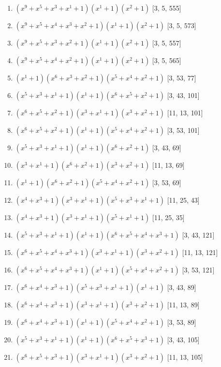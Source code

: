 \documentclass[10pt,twocolumn]{article}
\begin{document}
\begin{enumerate}
\item $(x^{9} + x^{5} + x^{3} + x^{1} + 1)(x^{1} + 1)(x^{2} + 1)$  [3, 5, 555]
\item $(x^{9} + x^{5} + x^{4} + x^{3} + x^{2} + 1)(x^{1} + 1)(x^{2} + 1)$  [3, 5, 573]
\item $(x^{9} + x^{5} + x^{3} + x^{2} + 1)(x^{1} + 1)(x^{2} + 1)$  [3, 5, 557]
\item $(x^{9} + x^{5} + x^{4} + x^{2} + 1)(x^{1} + 1)(x^{2} + 1)$  [3, 5, 565]
\item $(x^{1} + 1)(x^{6} + x^{3} + x^{2} + 1)(x^{5} + x^{4} + x^{2} + 1)$  [3, 53, 77]
\item $(x^{5} + x^{3} + x^{1} + 1)(x^{1} + 1)(x^{6} + x^{5} + x^{2} + 1)$  [3, 43, 101]
\item $(x^{6} + x^{5} + x^{2} + 1)(x^{3} + x^{1} + 1)(x^{3} + x^{2} + 1)$  [11, 13, 101]
\item $(x^{6} + x^{5} + x^{2} + 1)(x^{1} + 1)(x^{5} + x^{4} + x^{2} + 1)$  [3, 53, 101]
\item $(x^{5} + x^{3} + x^{1} + 1)(x^{1} + 1)(x^{6} + x^{2} + 1)$  [3, 43, 69]
\item $(x^{3} + x^{1} + 1)(x^{6} + x^{2} + 1)(x^{3} + x^{2} + 1)$  [11, 13, 69]
\item $(x^{1} + 1)(x^{6} + x^{2} + 1)(x^{5} + x^{4} + x^{2} + 1)$  [3, 53, 69]
\item $(x^{4} + x^{3} + 1)(x^{3} + x^{1} + 1)(x^{5} + x^{3} + x^{1} + 1)$  [11, 25, 43]
\item $(x^{4} + x^{3} + 1)(x^{3} + x^{1} + 1)(x^{5} + x^{1} + 1)$  [11, 25, 35]
\item $(x^{5} + x^{3} + x^{1} + 1)(x^{1} + 1)(x^{6} + x^{5} + x^{4} + x^{3} + 1)$  [3, 43, 121]
\item $(x^{6} + x^{5} + x^{4} + x^{3} + 1)(x^{3} + x^{1} + 1)(x^{3} + x^{2} + 1)$  [11, 13, 121]
\item $(x^{6} + x^{5} + x^{4} + x^{3} + 1)(x^{1} + 1)(x^{5} + x^{4} + x^{2} + 1)$  [3, 53, 121]
\item $(x^{6} + x^{4} + x^{3} + 1)(x^{5} + x^{3} + x^{1} + 1)(x^{1} + 1)$  [3, 43, 89]
\item $(x^{6} + x^{4} + x^{3} + 1)(x^{3} + x^{1} + 1)(x^{3} + x^{2} + 1)$  [11, 13, 89]
\item $(x^{6} + x^{4} + x^{3} + 1)(x^{1} + 1)(x^{5} + x^{4} + x^{2} + 1)$  [3, 53, 89]
\item $(x^{5} + x^{3} + x^{1} + 1)(x^{1} + 1)(x^{6} + x^{5} + x^{3} + 1)$  [3, 43, 105]
\item $(x^{6} + x^{5} + x^{3} + 1)(x^{3} + x^{1} + 1)(x^{3} + x^{2} + 1)$  [11, 13, 105]

\end{enumerate}
\end{document}
